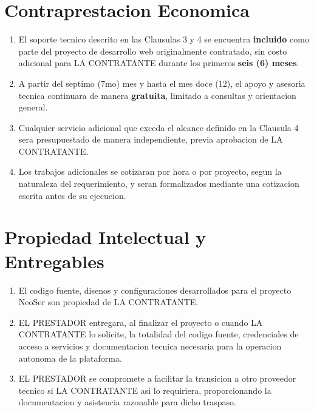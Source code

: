 \documentclass[12pt,a4paper]{article}
\begin{document}
\section{Contraprestacion Economica}

\begin{enumerate}[label=\textbf{\color{pink}\arabic*.}, leftmargin=2em, itemsep=0.4em]
  \item El soporte tecnico descrito en las Clausulas 3 y 4 se encuentra \textbf{incluido} como parte del proyecto de desarrollo web originalmente contratado, sin costo adicional para LA CONTRATANTE durante los primeros \textbf{seis (6) meses}.
  \item A partir del septimo (7mo) mes y hasta el mes doce (12), el apoyo y asesoria tecnica continuara de manera \textbf{gratuita}, limitado a consultas y orientacion general.
  \item Cualquier servicio adicional que exceda el alcance definido en la Clausula 4 sera presupuestado de manera independiente, previa aprobacion de LA CONTRATANTE.
  \item Los trabajos adicionales se cotizaran por hora o por proyecto, segun la naturaleza del requerimiento, y seran formalizados mediante una cotizacion escrita antes de su ejecucion.
\end{enumerate}

\section{Propiedad Intelectual y Entregables}

\begin{enumerate}[label=\textbf{\color{pink}\arabic*.}, leftmargin=2em, itemsep=0.4em]
  \item El codigo fuente, disenos y configuraciones desarrollados para el proyecto NeoSer son propiedad de LA CONTRATANTE.
  \item EL PRESTADOR entregara, al finalizar el proyecto o cuando LA CONTRATANTE lo solicite, la totalidad del codigo fuente, credenciales de acceso a servicios y documentacion tecnica necesaria para la operacion autonoma de la plataforma.
  \item EL PRESTADOR se compromete a facilitar la transicion a otro proveedor tecnico si LA CONTRATANTE asi lo requiriera, proporcionando la documentacion y asistencia razonable para dicho traspaso.
\end{enumerate}
\end{document}
